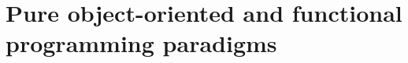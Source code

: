 \section{Pure object-oriented and functional programming paradigms}
\label{sec:objects-oriented-functional-paradigms}
